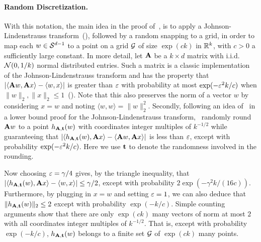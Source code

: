 \paragraph{Random Discretization.}
With this notation, the main idea in the proof of~\cite{SVMbest}, is to apply a Johnson-Lindenstrauss transform~(\cite{JL84}), followed by a random snapping to a grid, in order to map each $w \in \mathcal{S}^{d-1}$ to a point on a grid $\mathcal{G}$ of size $\exp(c k)$ in $\mathbb{R}^k$, with $c > 0$ a sufficiently large constant. In more detail, let $\mathbf{A}$ be a $k \times d$ matrix with i.i.d.\ $\mathcal{N}(0,1/k)$ normal distributed entries. Such a matrix is a classic implementation of the Johnson-Lindenstrauss transform and has the property that $|\langle \mathbf{A} w, \mathbf{A} x \rangle - \langle w, x \rangle|$ is greater than $\varepsilon$ with probability at most $\exp(-\varepsilon^2 k/c)$ when $\|w\|_2,\|x\|_2 \leq 1$~(\cite{DG03}). Note that this also preserves the norm of a vector $w$ by considering $x=w$ and noting $\langle w, w \rangle = \|w\|_2^2$. Secondly, following an idea of~\cite{AK17} in a lower bound proof for the Johnson-Lindenstrauss transform,~\cite{SVMbest} randomly round $\mathbf{A} w$ to a point $h_{\mathbf{A},\mathbf{t}}(w)$ with coordinates integer multiples of $k^{-1/2}$ while guaranteeing that $|\langle h_{\mathbf{A},\mathbf{t}}(w), \mathbf{A} x \rangle-\langle \mathbf{A} w, \mathbf{A} x \rangle|$ is less than $\varepsilon$, except with probability $\exp(- \varepsilon^2 k/c)$. Here we use $\mathbf{t}$ to denote the randomness involved in the rounding.

Now choosing $\varepsilon= \gamma/4$ gives, by the triangle inequality, that $|\langle h_{\mathbf{A},\mathbf{t}}(w), \mathbf{A} x \rangle-\langle w, x \rangle| \leq \gamma/2$, except with probability $2\exp(- \gamma^2 k/(16c))$. Furthermore, by plugging in $x=w$ and setting $\varepsilon=1$, we can also deduce that $\|h_{\mathbf{A},\mathbf{t}}(w)\|_2 \leq 2$ except with probability $\exp(-k/c)$. Simple counting arguments show that there are only $\exp(c k)$ many vectors of norm at most $2$ with all coordinates integer multiples of $k^{-1/2}$. That is, except with probability $\exp(-k/c)$, $h_{\mathbf{A},\mathbf{t}}(w)$ belongs to a finite set $\mathcal{G}$ of $\exp(c k)$ many points. 

